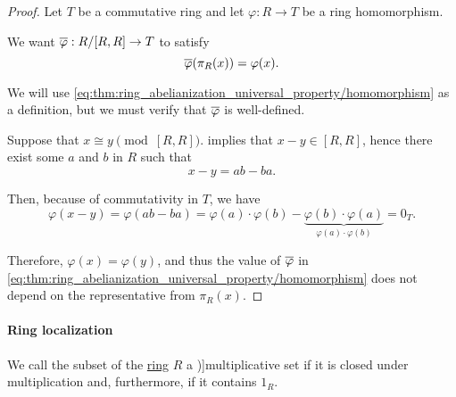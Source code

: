 \begin{proof}
  Let \( T \) be a commutative ring and let \( \varphi: R \to T \) be a ring homomorphism.

  We want \( \oline{\varphi}: R / [R, R] \to T \) to satisfy
  \begin{equation}\label{eq:thm:ring_abelianization_universal_property/homomorphism}
    \oline{\varphi}(\pi_R(x)) = \varphi(x).
  \end{equation}

  We will use \eqref{eq:thm:ring_abelianization_universal_property/homomorphism} as a definition, but we must verify that \( \oline{\varphi} \) is well-defined.

  Suppose that \( x \cong y \pmod {[R, R]} \).  implies that \( x - y \in [R, R] \), hence there exist some \( a \) and \( b \) in \( R \) such that
  \begin{equation*}
    x - y = ab - ba.
  \end{equation*}

  Then, because of commutativity in \( T \), we have
  \begin{equation*}
    \varphi(x - y)
    =
    \varphi(ab - ba)
    =
    \varphi(a) \cdot \varphi(b) - \underbrace{\varphi(b) \cdot \varphi(a)}_{\varphi(a) \cdot \varphi(b)}
    =
    0_T.
  \end{equation*}

  Therefore, \( \varphi(x) = \varphi(y) \), and thus the value of \( \oline{\varphi} \) in \eqref{eq:thm:ring_abelianization_universal_property/homomorphism} does not depend on the representative from \( \pi_R(x) \).
\end{proof}

\paragraph{Ring localization}

\begin{definition}\label{def:multiplicative_set_in_ring}
  We call the subset of the \hyperref[def:ring]{ring} \( R \) a \term[bg=мултипликативно затворено множество (\cite[23]{КоцевСидеров2016})]{multiplicative set} if it is closed under multiplication and, furthermore, if it contains \( 1_R \).
\end{definition}


